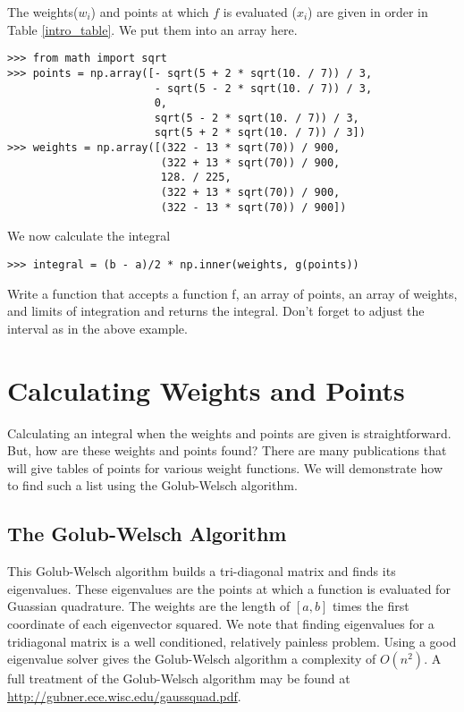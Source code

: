 The weights($w_i$) and points at which $f$ is evaluated ($x_i$) are given in order in Table \ref{intro_table}.
We put them into an array here.

\begin{lstlisting}
>>> from math import sqrt
>>> points = np.array([- sqrt(5 + 2 * sqrt(10. / 7)) / 3,
                       - sqrt(5 - 2 * sqrt(10. / 7)) / 3,
                       0,
                       sqrt(5 - 2 * sqrt(10. / 7)) / 3,
                       sqrt(5 + 2 * sqrt(10. / 7)) / 3])
>>> weights = np.array([(322 - 13 * sqrt(70)) / 900,
                        (322 + 13 * sqrt(70)) / 900,
                        128. / 225,
                        (322 + 13 * sqrt(70)) / 900,
                        (322 - 13 * sqrt(70)) / 900])
\end{lstlisting}

We now calculate the integral

\begin{lstlisting}
>>> integral = (b - a)/2 * np.inner(weights, g(points))
\end{lstlisting}

\begin{problem}
Write a function that accepts a function f, an array of points, an array of weights, and limits of integration and returns the integral.
Don't forget to adjust the interval as in the above example.
\end{problem}

\section*{Calculating Weights and Points}

Calculating an integral when the weights and points are given is straightforward.
But, how are these weights and points found?
There are many publications that will give tables of points for various weight functions.
We will demonstrate how to find such a list using the Golub-Welsch algorithm.

\subsection*{The Golub-Welsch Algorithm}

This Golub-Welsch algorithm builds a tri-diagonal matrix and finds its eigenvalues.
These eigenvalues are the points at which a function is evaluated for Guassian quadrature.
The weights are the length of $\left[a, b\right]$ times the first coordinate of each eigenvector squared.
We note that finding eigenvalues for a tridiagonal matrix is a well conditioned, relatively painless problem.
Using a good eigenvalue solver gives the Golub-Welsch algorithm a complexity of $O(n^2)$.
A full treatment of the Golub-Welsch algorithm may be found at \url{http://gubner.ece.wisc.edu/gaussquad.pdf}.


